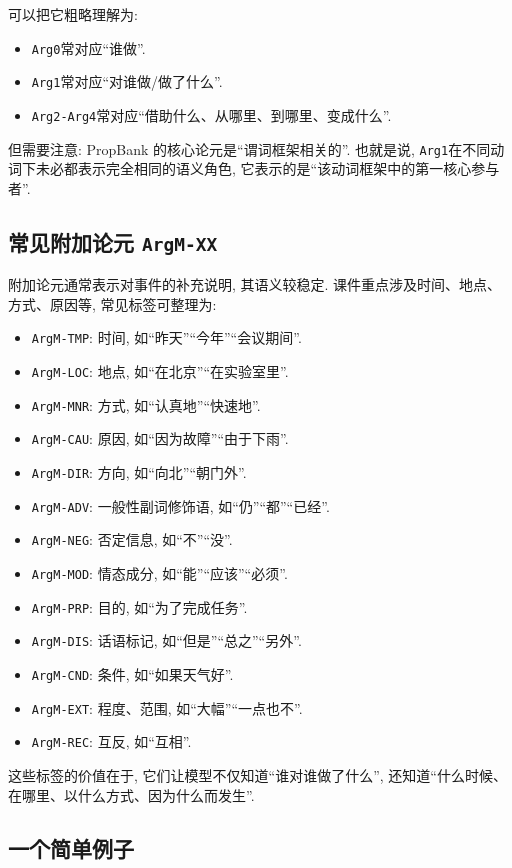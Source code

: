 可以把它粗略理解为:

\begin{itemize}
\item \texttt{Arg0}常对应“谁做”.
\item \texttt{Arg1}常对应“对谁做/做了什么”.
\item \texttt{Arg2-Arg4}常对应“借助什么、从哪里、到哪里、变成什么”.
\end{itemize}

但需要注意:
PropBank 的核心论元是“谓词框架相关的”.
也就是说, \texttt{Arg1}在不同动词下未必都表示完全相同的语义角色,
它表示的是“该动词框架中的第一核心参与者”.

\subsection{常见附加论元 \texttt{ArgM-XX}}


附加论元通常表示对事件的补充说明, 其语义较稳定.
课件重点涉及时间、地点、方式、原因等, 常见标签可整理为:

\begin{itemize}
\item \texttt{ArgM-TMP}: 时间, 如“昨天”“今年”“会议期间”.
\item \texttt{ArgM-LOC}: 地点, 如“在北京”“在实验室里”.
\item \texttt{ArgM-MNR}: 方式, 如“认真地”“快速地”.
\item \texttt{ArgM-CAU}: 原因, 如“因为故障”“由于下雨”.
\item \texttt{ArgM-DIR}: 方向, 如“向北”“朝门外”.
\item \texttt{ArgM-ADV}: 一般性副词修饰语, 如“仍”“都”“已经”.
\item \texttt{ArgM-NEG}: 否定信息, 如“不”“没”.
\item \texttt{ArgM-MOD}: 情态成分, 如“能”“应该”“必须”.
\item \texttt{ArgM-PRP}: 目的, 如“为了完成任务”.
\item \texttt{ArgM-DIS}: 话语标记, 如“但是”“总之”“另外”.
\item \texttt{ArgM-CND}: 条件, 如“如果天气好”.
\item \texttt{ArgM-EXT}: 程度、范围, 如“大幅”“一点也不”.
\item \texttt{ArgM-REC}: 互反, 如“互相”.
\end{itemize}

这些标签的价值在于, 它们让模型不仅知道“谁对谁做了什么”,
还知道“什么时候、在哪里、以什么方式、因为什么而发生”.

\subsection{一个简单例子}


